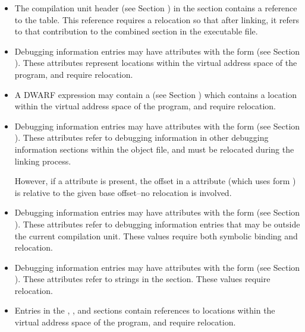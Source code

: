 \begin{itemize}
\item The compilation unit header (see Section 
) in the \dotdebuginfo{}
section contains a reference to the \dotdebugabbrev{} table. This
reference requires a relocation so that after linking, it refers to
that contribution to the combined \dotdebugabbrev{} section in the
executable file.

\item Debugging information entries may have attributes with the form
\DWFORMaddr{} (see Section ). 
These attributes represent locations
within the virtual address space of the program, and require
relocation.

\item A DWARF expression may contain a \DWOPaddr{} (see Section 
) which contains a location within 
the virtual address space of the program, and require relocation.

\item Debugging information entries may have attributes with the form
\DWFORMsecoffset{} (see Section ). 
These attributes refer to
debugging information in other debugging information sections within
the object file, and must be relocated during the linking process.

However, if a \DWATrangesbase{} attribute is present, the offset in
a \DWATranges{} attribute (which uses form \DWFORMsecoffset) is
relative to the given base offset--no relocation is involved.

\item Debugging information entries may have attributes with the form
\DWFORMrefaddr{} (see Section ). 
These attributes refer to
debugging information entries that may be outside the current
compilation unit. These values require both symbolic binding and
relocation.

\item Debugging information entries may have attributes with the form
\DWFORMstrp{} (see Section ). 
These attributes refer to strings in
the \dotdebugstr{} section. These values require relocation.

\item Entries in the \dotdebugaddr, \dotdebugloc{}, \dotdebugranges{} 
and \dotdebugaranges{}
sections contain references to locations within the virtual address
space of the program, and require relocation.


\end{itemize}
